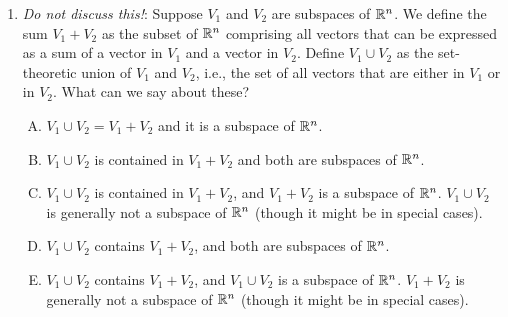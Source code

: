 \documentclass[10pt]{amsart}
\begin{document}
\begin{enumerate}
  {\em Answer}: Option (E)

  {\em Explanation}: The image of $T_1 + T_2$ is contained in the sum
  of the images of $T_1$ and $T_2$, hence its dimension is at most the
  dimension of the sum of the images of $T_1$ and $T_2$. The dimension
  of the sum of subspaces is at most equal to the sum of the
  dimensions (because we can take the union of the spanning
  sets). Thus, the dimension of the image of $T_1 + T_2$ is at most
  equal to $d_1 + d_2$.

  For the lower bound of $|d_2 - d_1|$, note that the dimension of the
  image of $T_1$ is at most the sum of the dimensions of the images of
  $T_1 + T_2$ and of $T_2$ and also that the dimension of the image of
  $T_2$ is at most the sum of the dimensions of the images of $T_1 +
  T_2$ and of $T_1$. This gives lower bounds of $d_1 - d_2$ and $d_2 -
  d_1$ respectively on the dimension of the image of $T_1 + T_2$. The
  maximum of these is $|d_2 - d_1|$, which is the lower bound.

  It is easy to construct examples of diagonal matrices with $0$, $1$
  and $-1$ as the diagonal entries to realize any $r$ with $|d_2 -
  d_1| \le r \le d_1 + d_2$.

  {\em Performance review}: 11 out of 23 people got this. 7 chose (C),
  3 chose (B), 2 chose (D).

  {\em Historical note (last time)}: $12$ out of $26$ got this. $8$ chose (B),
  $2$ each chose (A) and (C), $1$ chose (D).

\item {\em Do not discuss this!}: Suppose $V_1$ and $V_2$ are
  subspaces of $\mathbb{R}^n$. We define the sum $V_1 + V_2$ as the subset of
  $\mathbb{R}^n$ comprising all vectors that can be expressed as a sum of a
  vector in $V_1$ and a vector in $V_2$. Define $V_1 \cup V_2$ as the
  set-theoretic union of $V_1$ and $V_2$, i.e., the set of all vectors
  that are either in $V_1$ or in $V_2$. What can we say about these?

  \begin{enumerate}[(A)]
  \item $V_1 \cup V_2 = V_1 + V_2$ and it is a subspace of $\mathbb{R}^n$.
  \item $V_1 \cup V_2$ is contained in $V_1 + V_2$ and both are subspaces of $\mathbb{R}^n$.
  \item $V_1 \cup V_2$ is contained in $V_1 + V_2$, and $V_1 + V_2$ is
    a subspace of $\mathbb{R}^n$. $V_1 \cup V_2$ is generally not a subspace
    of $\mathbb{R}^n$ (though it might be in special cases).
  \item $V_1 \cup V_2$ contains $V_1 + V_2$, and both are subspaces of $\mathbb{R}^n$.
  \item $V_1 \cup V_2$ contains $V_1 + V_2$, and $V_1 \cup V_2$ is a
    subspace of $\mathbb{R}^n$. $V_1 + V_2$ is generally not a subspace of
    $\mathbb{R}^n$ (though it might be in special cases).
  \end{enumerate}


\end{enumerate}
\end{document}
